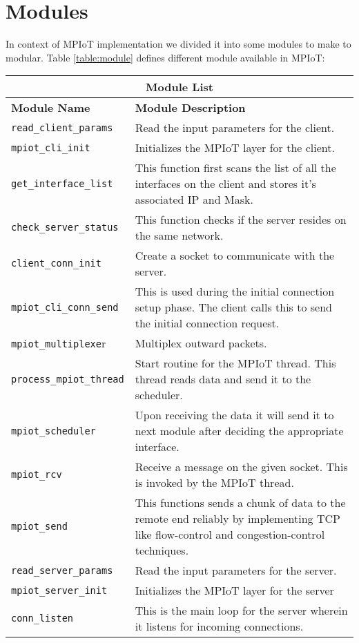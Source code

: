 \section{Modules}
In context of MPIoT implementation we divided it into some modules to make to modular. Table \ref{table:module} defines different module available in MPIoT:

\begin{longtable}{ |p{5cm}||p{11cm}|  }
 \hline
 \multicolumn{2}{|c|}{\textbf{Module List}} \\
 \hline
 \textbf{Module Name}& \textbf{Module Description}\\
 \hline
 \verb|read_client_params|   & Read the input parameters for the client.\\ \hline
 \verb|mpiot_cli_init|&   Initializes the MPIoT layer for the client.\\ \hline
 \verb|get_interface_list| &This function first scans the list of all the interfaces on the client and stores it's associated IP and Mask.\\ \hline
 \verb|check_server_status|    &This function checks if the server resides on the same network.\\
 \verb|client_conn_init|&   Create a socket to communicate with the server.\\ \hline
 \verb|mpiot_cli_conn_send| & This is used during the initial connection setup phase. The client calls this to send the initial connection request.\\ \hline
 \verb|mpiot_multiplexe|r& Multiplex outward packets. \\  \hline
 \verb|process_mpiot_thread|& Start routine for the MPIoT thread. This thread reads data and send it to the scheduler.\\  \hline
 \verb|mpiot_scheduler|& Upon receiving the data it will send it to next module after deciding the appropriate interface.\\  \hline
 \verb|mpiot_rcv|& Receive a message on the given socket. This is invoked by the MPIoT thread.\\  \hline
 \verb|mpiot_send|& This functions sends a chunk of data to the remote end reliably by implementing TCP like flow-control and congestion-control techniques.\\  \hline
 \verb|read_server_params|& Read the input parameters for the server.\\  \hline
 \verb|mpiot_server_init|& Initializes the MPIoT layer for the server\\  \hline
 \verb|conn_listen|& This is the main loop for the server wherein it listens for incoming connections.\\  \hline

\end{longtable}
